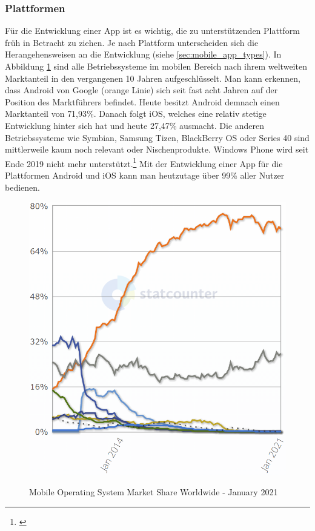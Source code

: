 \subsubsection{Plattformen}

Für die Entwicklung einer App ist es wichtig, die zu unterstützenden Plattform früh in Betracht zu ziehen. Je nach Plattform unterscheiden sich die Herangehensweisen an die Entwicklung (siehe \ref{sec:mobile_app_types}). In Abbildung \ref{fig:mobile_os_market_share} sind alle Betriebssysteme im mobilen Bereich nach ihrem weltweiten Marktanteil in den vergangenen 10 Jahren aufgeschlüsselt. Man kann erkennen, dass Android von Google (orange Linie) sich seit fast acht Jahren auf der Position des Marktführers befindet. Heute besitzt Android demnach einen Marktanteil von {71,93\%}. Danach folgt iOS, welches eine relativ stetige Entwicklung hinter sich hat und heute {27,47\%} ausmacht. Die anderen Betriebssysteme wie Symbian, Samsung Tizen, BlackBerry OS oder Series 40 sind mittlerweile kaum noch relevant oder Nischenprodukte. Windows Phone wird seit Ende 2019 nicht mehr unterstützt.\footnote{\cite[Vgl.][83]{Kollmann2020}} Mit der Entwicklung einer App für die Plattformen Android und iOS kann man heutzutage über {99\%} aller Nutzer bedienen.

\begin{figure}[hbt]
    \centering
    \begin{minipage}[t]{.7\textwidth}
        \caption{Mobile Operating System Market Share Worldwide - January 2021}
        \includegraphics[width=1\textwidth]{img/Mobile_OS_MarketShare.png}\\
        \label{fig:mobile_os_market_share}
    \end{minipage}
\end{figure}

